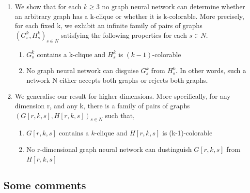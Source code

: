 \begin{enumerate}
    \item We show that for each $k\geq3$ no graph neural network can determine whether an arbitrary graph has a k-clique or whether it is k-colorable. More precisely, for each fixed k, we exhibit an 
infinite family of pairs of graphs ${(G_s^k,H_s^k)}_{s\in N}$  satisfying the following properties for each $s\in N$. 
    \begin{enumerate}
        \item $G_s^k$ contains a k-clique and $H_s^k$ is $(k-1)$-colorable
        \item No graph neural network can disguise $G_s^k$ from $H_s^k$. In other words, such a network N either accepts both graphs or rejects both graphs.
    \end{enumerate}
    \item We generalise our result for higher dimensions. More specifically, for any dimension r, and any k, there is a family of pairs of graphs ${(G[r,k,s],H[r,k,s])}_{s\in N}$ such that,
    \begin{enumerate}
        \item $G[r,k,s]$ contains a $k$-clique and $H[r,k,s]$ is (k-1)-colorable 
        \item No r-dimensional graph neural network can dustinguish $G[r,k,s]$ from $H[r,k,s]$
    \end{enumerate}
\end{enumerate}

\subsection{Some comments}

